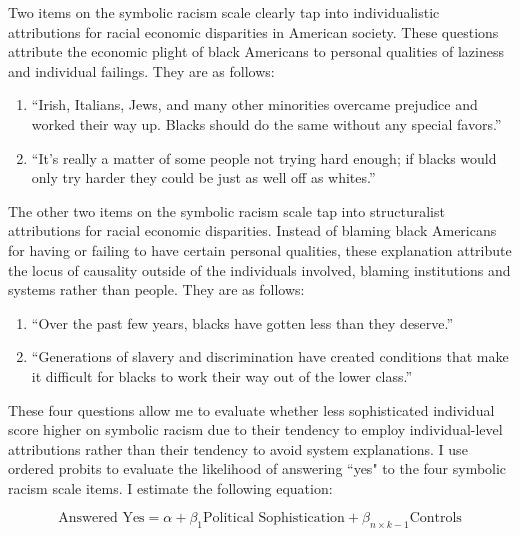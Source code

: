 \documentclass[12pt]{paper}
\begin{document}
Two items on the symbolic racism scale clearly tap into individualistic attributions for racial economic disparities in American society. These questions attribute the economic plight of black Americans to personal qualities of laziness and individual failings. They are as follows: 

\begin{enumerate}
\item``Irish, Italians, Jews, and many other minorities
overcame prejudice and worked their way up. Blacks should do the same without any special favors.”

\item``It’s really a matter of some people not trying
hard enough; if blacks would only try harder they
could be just as well off as whites.”
\end{enumerate}

The other two items on the symbolic racism scale tap into structuralist attributions for racial economic disparities. Instead of blaming black Americans for having or failing to have certain personal qualities, these explanation attribute the locus of causality outside of the individuals involved, blaming institutions and systems rather than people. They are as follows: 

\begin{enumerate}
	\item``Over the past few years, blacks have gotten less
	than they deserve.”
	
	\item``Generations of slavery and discrimination have
	created conditions that make it difficult for blacks
	to work their way out of the lower class.” 
\end{enumerate}

These four questions allow me to evaluate whether less sophisticated individual score higher on symbolic racism due to their tendency to employ individual-level attributions rather than their tendency to avoid system explanations. I use ordered probits to evaluate the likelihood of answering ``yes" to the four symbolic racism scale items. I estimate the following equation:

\[\text{Answered Yes} = \alpha + \beta_1\text{Political Sophistication} + \beta_{n\times k-1}\text{Controls}\]
\end{document}

